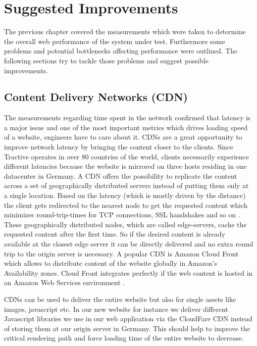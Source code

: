 \chapter{Suggested Improvements}
\label{chap:improvements}

The previous chapter covered the measurements which were taken to determine the overall web performance of the system under test. Furthermore some problems and potential bottlenecks affecting performance were outlined. The following sections try to tackle those problems and suggest possible improvements.

\section{Content Delivery Networks (CDN)}

The measurements regarding time spent in the network confirmed that latency is a major issue and one of the most important metrics which drives loading speed of a website, engineers have to care about it. CDNs are a great opportunity to improve network latency by bringing the content closer to the clients. Since Tractive operates in over 80 countries of the world, clients necessarily experience different latencies because the website is mirrored on three hosts residing in one datacenter in Germany. A CDN offers the possibility to replicate the content across a set of geographically distributed servers instead of putting them only at a single location. Based on the latency (which is mostly driven by the distance) the client gets redirected to the nearest node to get the requested content which minimizes round-trip-times for TCP connections, SSL handshakes and so on \cite{Google_2009}. These geographically distributed nodes, which are called edge-servers, cache the requested content after the first time. So if the desired content is already available at the closest edge server it can be directly delivered and no extra round trip to the origin server is necessary. A popular CDN is Amazon Cloud Front which allows to distribute content of the website globally in Amazon's Availability zones. Cloud Front integrates perfectly if the web content is hosted in an Amazon Web Services environment \cite{Amazon_2015}.

CDNs can be used to deliver the entire website but also for single assets like images, javascript etc. In our new website for instance we deliver different Javascript libraries we use in our web application via the CloudFare CDN instead of storing them at our origin server in Germany. This should help to improve the critical rendering path and force loading time of the entire website to decrease.

